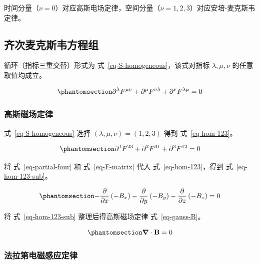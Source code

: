 \documentclass[
  chinese,
  a4paper,
  UTF8,
  12pt,
  oneside,
  openany]{ctexbook}
\theoremstyle{plain}
\theoremstyle{plain}
\theoremstyle{plain}
\theoremstyle{definition}
\theoremstyle{plain}
\theoremstyle{plain}
\theoremstyle{remark}
\begin{document}
时间分量（\(\nu = 0\)）对应高斯电场定律，空间分量（\(\nu = 1,2,3\)）对应安培-麦克斯韦定律。

\subsection{齐次麦克斯韦方程组}\label{ux9f50ux6b21ux9ea6ux514bux65afux97e6ux65b9ux7a0bux7ec4}

循环（指标三重交替）形式为 式~\ref{eq-S-homogeneous}，该式对指标
\(\lambda,\mu,\nu\) 的任意取值均成立。

\begin{equation}\protect\phantomsection\label{eq-S-homogeneous}{
\partial^{\lambda}F^{\mu\nu} + \partial^{\mu}F^{\nu\lambda} + \partial^{\nu}F^{\lambda\mu} = 0
}\end{equation}

\subsubsection{高斯磁场定律}\label{ux9ad8ux65afux78c1ux573aux5b9aux5f8b}

式~\ref{eq-S-homogeneous} 选择 \((\lambda,\mu,\nu) = (1,2,3)\) 得到
式~\ref{eq-hom-123}。

\begin{equation}\protect\phantomsection\label{eq-hom-123}{
\partial^{1}F^{23} + \partial^{2}F^{31} + \partial^{3}F^{12} = 0
}\end{equation}

将 式~\ref{eq-partial-four} 和 式~\ref{eq-F-matrix} 代入
式~\ref{eq-hom-123}，得到 式~\ref{eq-hom-123-sub}。

\begin{equation}\protect\phantomsection\label{eq-hom-123-sub}{
- \frac{\partial}{\partial x}\left(- B_x \right) - \frac{\partial}{\partial y}\left(- B_y \right) - \frac{\partial}{\partial z}\left(- B_z \right) = 0
}\end{equation}

将 式~\ref{eq-hom-123-sub} 整理后得高斯磁场定律 式~\ref{eq-gauss-B}。

\begin{equation}\protect\phantomsection\label{eq-gauss-B}{
\boldsymbol{\nabla} \cdot \mathbf{B} = 0
}\end{equation}

\subsubsection{法拉第电磁感应定律}\label{ux6cd5ux62c9ux7b2cux7535ux78c1ux611fux5e94ux5b9aux5f8b}
\end{document}
